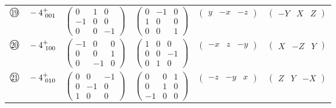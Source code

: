 \documentclass[fleqn,10pt,landscape]{jsarticle}
\begin{document}
\begin{center}
\begin{longtable}{lcccc}
$ {\ooalign{\hfil\resizebox{.8\width}{\height}{19}\hfil\crcr\raise.1ex\hbox{\large$\bigcirc$}}}\quad -4^{+}_{\,\,001} $ & $ \begin{pmatrix} 0 & 1 & 0 \\ -1 & 0 & 0 \\ 0 & 0 & -1 \end{pmatrix} $ & $ \begin{pmatrix} 0 & -1 & 0 \\ 1 & 0 & 0 \\ 0 & 0 & 1 \end{pmatrix} $ & $ \begin{pmatrix} y & - x & - z \end{pmatrix} $ & $ \begin{pmatrix} - Y & X & Z \end{pmatrix} $ \\
$ {\ooalign{\hfil\resizebox{.8\width}{\height}{20}\hfil\crcr\raise.1ex\hbox{\large$\bigcirc$}}}\quad -4^{+}_{\,\,100} $ & $ \begin{pmatrix} -1 & 0 & 0 \\ 0 & 0 & 1 \\ 0 & -1 & 0 \end{pmatrix} $ & $ \begin{pmatrix} 1 & 0 & 0 \\ 0 & 0 & -1 \\ 0 & 1 & 0 \end{pmatrix} $ & $ \begin{pmatrix} - x & z & - y \end{pmatrix} $ & $ \begin{pmatrix} X & - Z & Y \end{pmatrix} $ \\
$ {\ooalign{\hfil\resizebox{.8\width}{\height}{21}\hfil\crcr\raise.1ex\hbox{\large$\bigcirc$}}}\quad -4^{+}_{\,\,010} $ & $ \begin{pmatrix} 0 & 0 & -1 \\ 0 & -1 & 0 \\ 1 & 0 & 0 \end{pmatrix} $ & $ \begin{pmatrix} 0 & 0 & 1 \\ 0 & 1 & 0 \\ -1 & 0 & 0 \end{pmatrix} $ & $ \begin{pmatrix} - z & - y & x \end{pmatrix} $ & $ \begin{pmatrix} Z & Y & - X \end{pmatrix} $ \\

\end{longtable}
\end{center}
\end{document}
